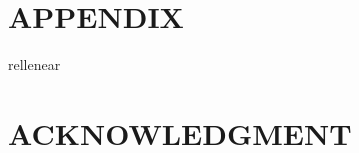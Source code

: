 \documentclass[journal]{IEEEtran}
\begin{document}

\section*{APPENDIX}

rellenear

\section*{ACKNOWLEDGMENT}

\begin{thebibliography}{99}



\end{thebibliography}
\end{document}
